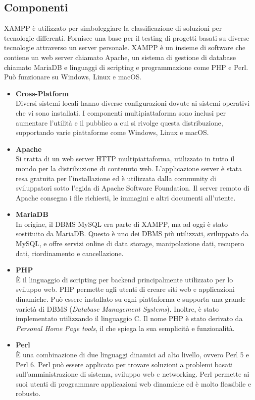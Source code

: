 \subsection{Componenti}
XAMPP è utilizzato per simboleggiare la classificazione di soluzioni per tecnologie differenti. Fornisce una base per il testing di progetti basati su diverse tecnologie attraverso un server personale. XAMPP è un insieme di software che contiene un web server chiamato Apache, un sistema di gestione di database chiamato MariaDB e linguaggi di scripting e programmazione come PHP e Perl. Può funzionare su Windows, Linux e macOS.
\begin{itemize}
    \item \textbf{Cross-Platform}\\
    Diversi sistemi locali hanno diverse configurazioni dovute ai sistemi operativi che vi sono installati. I componenti multipiattaforma sono inclusi per aumentare l'utilità e il pubblico a cui si rivolge questa distribuzione, supportando varie piattaforme come Windows, Linux e macOS.
    \item \textbf{Apache}\\
    Si tratta di un web server HTTP multipiattaforma, utilizzato in tutto il mondo per la distribuzione di contenuto web. L'applicazione server è stata resa gratuita per l'installazione ed è utilizzata dalla community di sviluppatori sotto l'egida di Apache Software Foundation. Il server remoto di Apache consegna i file richiesti, le immagini e altri documenti all'utente.
    \item \textbf{MariaDB}\\
    In origine, il DBMS MySQL era parte di XAMPP, ma ad oggi è stato sostituito da MariaDB. Questo è uno dei DBMS più utilizzati, sviluppato da MySQL, e offre servizi online di data storage, manipolazione dati, recupero dati, riordinamento e cancellazione.
    \item \textbf{PHP}\\
    \`E il linguaggio di scripting per backend principalmente utilizzato per lo sviluppo web. PHP permette agli utenti di creare siti web e applicazioni dinamiche. Può essere installato su ogni piattaforma e supporta una grande varietà di DBMS (\textit{Database Management Systems}). Inoltre, è stato implementato utilizzando il linguaggio C. Il nome PHP è stato derivato da \textit{Personal Home Page tools}, il che spiega la sua semplicità e funzionalità.
    \item \textbf{Perl}\\
    \`E una combinazione di due linguaggi dinamici ad alto livello, ovvero Perl 5 e Perl 6. Perl può essere applicato per trovare soluzioni a problemi basati sull'amministrazione di sistema, sviluppo web e networking. Perl permette ai suoi utenti di programmare applicazioni web dinamiche ed è molto flessibile e robusto.

\end{itemize}
